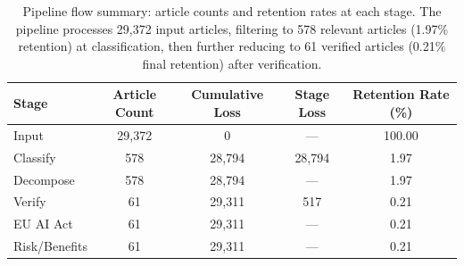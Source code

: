 \begin{table}[htbp]
    \centering
    \caption{Pipeline flow summary: article counts and retention rates at each stage. The pipeline processes 29,372 input articles, filtering to 578 relevant articles (1.97\% retention) at classification, then further reducing to 61 verified articles (0.21\% final retention) after verification.}
    \label{tab:pipeline-flow-summary}
    \begin{tabular}{lcccc}
        \toprule
        Stage & Article Count & Cumulative Loss & Stage Loss & Retention Rate (\%) \\
        \midrule
        Input & 29,372 & 0 & --- & 100.00 \\
        Classify & 578 & 28,794 & 28,794 & 1.97 \\
        Decompose & 578 & 28,794 & --- & 1.97 \\
        Verify & 61 & 29,311 & 517 & 0.21 \\
        EU AI Act & 61 & 29,311 & --- & 0.21 \\
        Risk/Benefits & 61 & 29,311 & --- & 0.21 \\
        \bottomrule
    \end{tabular}
\end{table}

